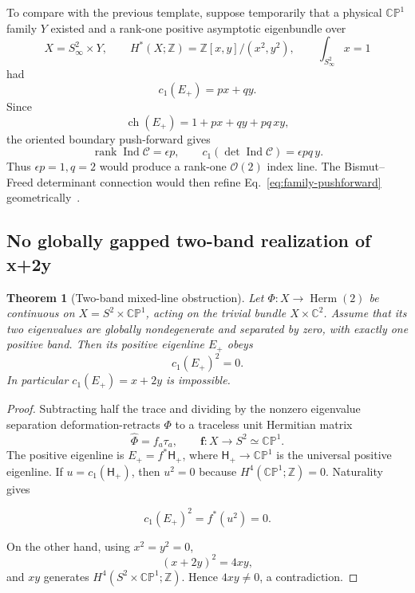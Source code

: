\documentclass[11pt]{article}
\newtheorem{theorem}{Theorem}[section]
\theoremstyle{definition}
\theoremstyle{remark}
\newcommand{\CC}{\mathbb C}
\newcommand{\ZZ}{\mathbb Z}
\newcommand{\CP}{\mathbb {CP}}
\newcommand{\cO}{\mathcal O}
\newcommand{\Ind}{\operatorname{Ind}}
\begin{document}
To compare with the previous template, suppose temporarily that a physical
\(\CP^1\) family \(Y\) existed and a rank-one positive asymptotic eigenbundle
over
\begin{equation}
 X=S^2_\infty\times Y,
 \qquad H^*(X;\ZZ)=\ZZ[x,y]/(x^2,y^2),
 \qquad \int_{S^2_\infty}x=1
 \label{eq:product-base}
\end{equation}
had
\begin{equation}
 c_1(E_+)=p x+q y.
 \label{eq:pq-line}
\end{equation}
Since
\begin{equation}
 \operatorname{ch}(E_+)
 =1+px+qy+pq\,xy,
 \label{eq:chern-character}
\end{equation}
the oriented boundary push-forward gives
\begin{equation}
 \operatorname{rank}\Ind\mathscr C=\epsilon p,
 \qquad
 c_1(\det\Ind\mathscr C)=\epsilon pq\,y.
 \label{eq:family-pushforward}
\end{equation}
Thus \(\epsilon p=1,q=2\) would produce a rank-one \(\cO(2)\) index line.
The Bismut--Freed determinant connection would then refine
Eq.~\eqref{eq:family-pushforward} geometrically~\cite{BismutFreed1986APE6,
BismutFreed1986IIAPE6}.

\subsection{No globally gapped two-band realization of x+2y}

\begin{theorem}[Two-band mixed-line obstruction]
Let \(\Phi:X\to\operatorname{Herm}(2)\) be continuous on
\(X=S^2\times\CP^1\), acting on the trivial bundle \(X\times\CC^2\).  Assume
that its two eigenvalues are globally nondegenerate and separated by zero,
with exactly one positive band.  Then its positive eigenline \(E_+\) obeys
\begin{equation}
 c_1(E_+)^2=0.
 \label{eq:square-zero}
\end{equation}
In particular \(c_1(E_+)=x+2y\) is impossible.
\end{theorem}

\begin{proof}
Subtracting half the trace and dividing by the nonzero eigenvalue separation
deformation-retracts \(\Phi\) to a traceless unit Hermitian matrix
\begin{equation}
 \widehat\Phi=f_a\tau_a,
 \qquad \bm f:X\longrightarrow S^2\simeq\CP^1.
 \label{eq:mass-map}
\end{equation}
The positive eigenline is \(E_+=f^*\mathsf H_+\), where
\(\mathsf H_+\to\CP^1\) is the universal positive eigenline.  If
\(u=c_1(\mathsf H_+)\), then \(u^2=0\) because
\(H^4(\CP^1;\ZZ)=0\).  Naturality gives

\[
 c_1(E_+)^2=f^*(u^2)=0.
\]

On the other hand, using \(x^2=y^2=0\),
\begin{equation}
 (x+2y)^2=4xy,
 \label{eq:mixed-square}
\end{equation}
and \(xy\) generates \(H^4(S^2\times\CP^1;\ZZ)\).  Hence
\(4xy\ne0\), a contradiction.
\end{proof}
\end{document}
